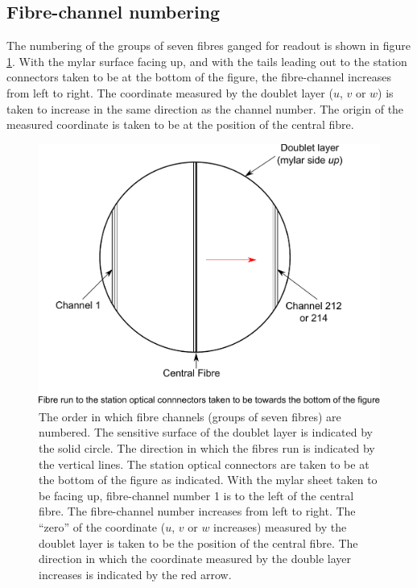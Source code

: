 \subsection{Fibre-channel numbering}
\label{SubSect:SciFiFbrNmbrng}

The numbering of the groups of seven fibres ganged for readout is shown in figure \ref{Fig:FbrChnlNmbrng}. With the mylar surface facing up, and with the tails leading out to the station connectors taken to be at the bottom of the figure, the fibre-channel increases from left to right. The coordinate measured by the doublet layer ($u$, $v$ or $w$) is taken to increase in the same direction as the channel number. The origin of the measured coordinate is taken to be at the position of the central fibre.

\begin{figure}
  \begin{center}
    \includegraphics[width=0.85\linewidth]{detectors/tracker/02-Definitions/Figures/fibre-channel-numbering.pdf}
  \end{center}
  \caption{The order in which fibre channels (groups of seven fibres) are numbered. The sensitive surface of the doublet layer is indicated by the solid circle. The direction in which the fibres run is indicated by the vertical lines. The station optical connectors are taken to be at the bottom of the figure as indicated. With the mylar sheet taken to be facing up, fibre-channel number 1 is to the left of the central fibre. The fibre-channel number increases from left to right. The ``zero'' of the coordinate ($u$, $v$ or $w$ increases) measured by the doublet layer is taken to be the position of the central fibre. The direction in which the coordinate measured by the double layer increases is indicated by the red arrow.}
  \label{Fig:FbrChnlNmbrng}
\end{figure}

